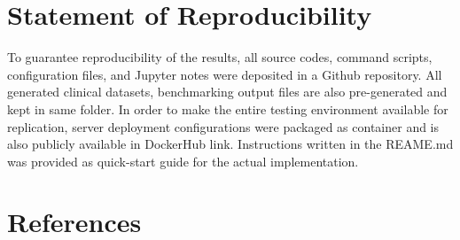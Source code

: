 \documentclass[5p]{elsarticle}
\begin{document}
\section*{Statement of Reproducibility}
To guarantee reproducibility of the results, all source codes, command scripts, configuration files, and Jupyter notes were deposited in a Github repository. 
All generated clinical datasets, benchmarking output files are also pre-generated and kept in same folder. 
In order to make the entire testing environment available for replication, server deployment configurations were packaged as container and is also publicly available in DockerHub link. 
Instructions written in the REAME.md was provided as quick-start guide for the actual implementation.

\section*{References}


\end{document}
